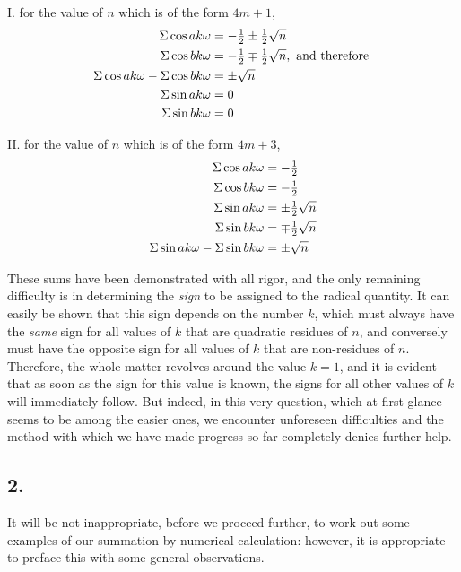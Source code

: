 \documentclass[twoside,12pt, showframe]{memoir}
\let\oldfrac\frac
\def\frac#1#2{\mathchoice{\tfrac{#1}{#2}}{\oldfrac{#1}{#2}}{\genfrac{}{}{}{2}{#1}{#2\mathstrut}}{\genfrac{}{}{}{3}{#1}{#2\mathstrut}}}
\begin{document}
I. for the value of \(n\) which is of the form \(4m+1\),
\[\begin{aligned}
\Sigma \cos a k \omega & =-\frac{1}{2} \pm \frac{1}{2} \sqrt{n} \\
\Sigma \cos b k \omega & =-\frac{1}{2} \mp \frac{1}{2} \sqrt{n}, \text{ and therefore } \\
\Sigma \cos a k \omega -\Sigma \cos b k \omega & = \pm \sqrt{n} \\
\Sigma \sin a k \omega & =0 \\
\Sigma \sin b k \omega & =0
\end{aligned}\]\clearpage\noindent%

II. for the value of \(n\) which is of the form \(4m+3\),
\[\begin{aligned}
\Sigma \cos a k \omega & =-\frac{1}{2} \\
\Sigma \cos b k \omega & =-\frac{1}{2} \\
\Sigma \sin a k \omega & = \pm \frac{1}{2} \sqrt{n} \\
\Sigma \sin b k \omega & =\mp \frac{1}{2} \sqrt{n} \\
\Sigma \sin a k \omega -\Sigma \sin b k \omega & = \pm \sqrt{n}
\end{aligned}\]

These sums have been demonstrated with all rigor, and the only remaining difficulty is in determining the \textit{sign} to be assigned to the radical quantity. It can easily be shown that this sign depends on the number \(k\), which must always have the \textit{same} sign for all values of \(k\) that are quadratic residues of \(n\), and conversely must have the opposite sign for all values of \(k\) that are non-residues of \(n\). Therefore, the whole matter revolves around the value \(k=1\), and it is evident that as soon as the sign for this value is known, the signs for all other values of \(k\) will immediately follow. But indeed, in this very question, which at first glance seems to be among the easier ones, we encounter unforeseen difficulties and the method with which we have made progress so far completely denies further help.
%

\subsection*{2.}
 
It will be not inappropriate, before we proceed further, to work out some examples of our summation by numerical calculation: however, it is appropriate to preface this with some general observations.
%
\end{document}
